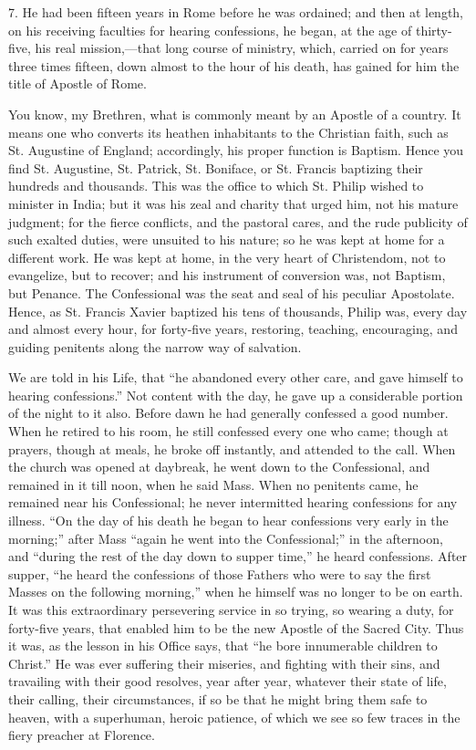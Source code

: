 7. He had been fifteen years in Rome before he was
ordained; and then at length, on his receiving faculties
for hearing confessions, he began, at the age of thirty-five, his real mission,—that long course of
ministry, which, carried on for years three times
fifteen, down almost to the hour of his death, has gained
for him the title of Apostle of Rome.

You know, my Brethren, what is commonly meant by an
Apostle of a country. It means one who converts its
heathen inhabitants to the Christian faith, such as St.
Augustine of England; accordingly, his proper function is
Baptism. Hence you find St. Augustine, St. Patrick, St.
Boniface, or St. Francis baptizing their hundreds and
thousands. This was the office to which St. Philip wished
to minister in India; but it was his zeal and charity
that urged him, not his mature judgment; for the fierce
conflicts, and the pastoral cares, and the rude publicity
of such exalted duties, were unsuited to his nature; so
he was kept at home for a different work. He was kept at
home, in the very heart of Christendom, not to
evangelize, but to recover; and his instrument of
conversion was, not Baptism, but Penance. The
Confessional was the seat and seal of his peculiar
Apostolate. Hence, as St. Francis Xavier baptized his
tens of thousands, Philip was, every day and almost every
hour, for forty-five years, restoring, teaching,
encouraging, and guiding penitents along the narrow way
of salvation.

We are told in his Life, that ``he abandoned every
other care, and gave himself to hearing
confessions.'' Not content with the day, he gave up a
considerable portion of the night to it also. Before dawn
he had generally confessed a good number. When he retired
to his room, he still confessed every one who came;
though at prayers, though at meals, he broke off
instantly, and attended to the call. When the church was
opened at daybreak, he went down to the Confessional, and
remained in it till noon, when he said Mass. When no
penitents came, he remained near his Confessional; he
never intermitted hearing confessions for any illness.
``On the day of his death he began to hear
confessions very early in the morning;'' after Mass
``again he went into the Confessional;'' in the
afternoon, and ``during the rest of the day down to
supper time,'' he heard confessions. After supper,
``he heard the confessions of those Fathers who were
to say the first Masses on the following morning,''
when he himself was no longer to be on earth. It was this
extraordinary persevering service in so trying, so
wearing a duty, for forty-five years, that enabled him to
be the new Apostle of the Sacred City. Thus it was, as
the lesson in his Office says, that ``he bore
innumerable children to Christ.'' He was ever
suffering their miseries, and fighting with their sins,
and travailing with their good resolves, year after year,
whatever their state of life, their calling, their
circumstances, if so be that he might bring them safe to
heaven, with a superhuman, heroic patience, of which we
see so few traces in the fiery preacher at Florence.


